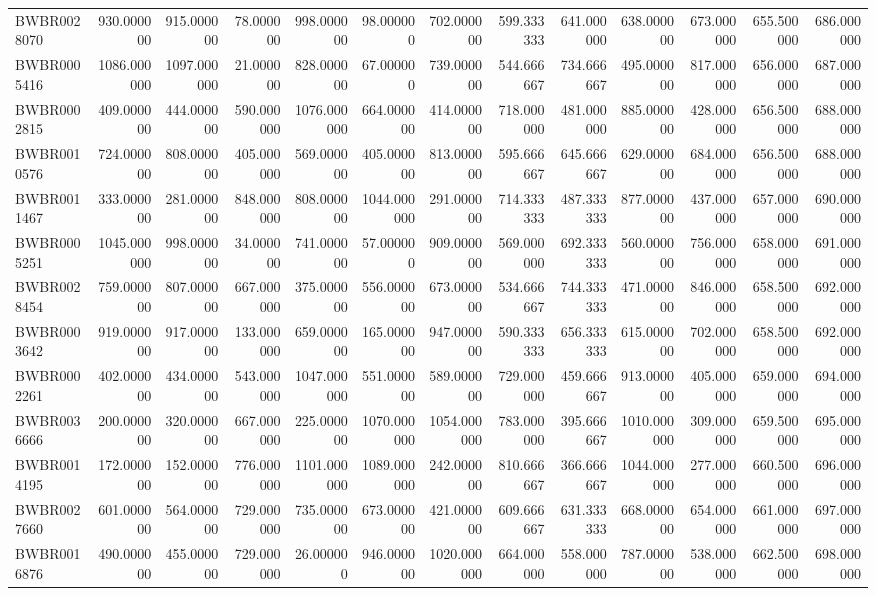 \begin{longtable}{lrrrrrrrrrrrr}
BWBR0028070 & 930.000000 & 915.000000 & 78.000000 & 998.000000 & 98.000000 & 702.000000 & 599.333333 & 641.000000 & 638.000000 & 673.000000 & 655.500000 & 686.000000 \\
BWBR0005416 & 1086.000000 & 1097.000000 & 21.000000 & 828.000000 & 67.000000 & 739.000000 & 544.666667 & 734.666667 & 495.000000 & 817.000000 & 656.000000 & 687.000000 \\
BWBR0002815 & 409.000000 & 444.000000 & 590.000000 & 1076.000000 & 664.000000 & 414.000000 & 718.000000 & 481.000000 & 885.000000 & 428.000000 & 656.500000 & 688.000000 \\
BWBR0010576 & 724.000000 & 808.000000 & 405.000000 & 569.000000 & 405.000000 & 813.000000 & 595.666667 & 645.666667 & 629.000000 & 684.000000 & 656.500000 & 688.000000 \\
BWBR0011467 & 333.000000 & 281.000000 & 848.000000 & 808.000000 & 1044.000000 & 291.000000 & 714.333333 & 487.333333 & 877.000000 & 437.000000 & 657.000000 & 690.000000 \\
BWBR0005251 & 1045.000000 & 998.000000 & 34.000000 & 741.000000 & 57.000000 & 909.000000 & 569.000000 & 692.333333 & 560.000000 & 756.000000 & 658.000000 & 691.000000 \\
BWBR0028454 & 759.000000 & 807.000000 & 667.000000 & 375.000000 & 556.000000 & 673.000000 & 534.666667 & 744.333333 & 471.000000 & 846.000000 & 658.500000 & 692.000000 \\
BWBR0003642 & 919.000000 & 917.000000 & 133.000000 & 659.000000 & 165.000000 & 947.000000 & 590.333333 & 656.333333 & 615.000000 & 702.000000 & 658.500000 & 692.000000 \\
BWBR0002261 & 402.000000 & 434.000000 & 543.000000 & 1047.000000 & 551.000000 & 589.000000 & 729.000000 & 459.666667 & 913.000000 & 405.000000 & 659.000000 & 694.000000 \\
BWBR0036666 & 200.000000 & 320.000000 & 667.000000 & 225.000000 & 1070.000000 & 1054.000000 & 783.000000 & 395.666667 & 1010.000000 & 309.000000 & 659.500000 & 695.000000 \\
BWBR0014195 & 172.000000 & 152.000000 & 776.000000 & 1101.000000 & 1089.000000 & 242.000000 & 810.666667 & 366.666667 & 1044.000000 & 277.000000 & 660.500000 & 696.000000 \\
BWBR0027660 & 601.000000 & 564.000000 & 729.000000 & 735.000000 & 673.000000 & 421.000000 & 609.666667 & 631.333333 & 668.000000 & 654.000000 & 661.000000 & 697.000000 \\
BWBR0016876 & 490.000000 & 455.000000 & 729.000000 & 26.000000 & 946.000000 & 1020.000000 & 664.000000 & 558.000000 & 787.000000 & 538.000000 & 662.500000 & 698.000000 \\

\end{longtable}
